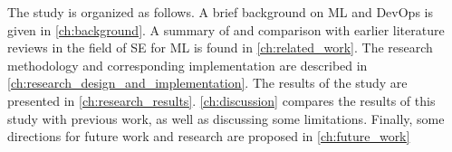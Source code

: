 The study is organized as follows.
A brief background on ML and DevOps is given in \cref{ch:background}.
A summary of and comparison with earlier literature reviews in the field of SE for ML is found in \cref{ch:related_work}.
The research methodology and corresponding implementation are described in \cref{ch:research_design_and_implementation}.
The results of the study are presented in \cref{ch:research_results}.
\cref{ch:discussion} compares the results of this study with previous work, as well as discussing some limitations.
Finally, some directions for future work and research are proposed in \cref{ch:future_work}
